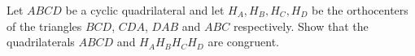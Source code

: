 Let $ABCD$ be a cyclic quadrilateral and let $H_{A}, H_{B}, H_{C}, H_{D}$ be the orthocenters of the triangles $BCD$,  $CDA$,  $DAB$ and $ABC$ respectively. Show that the quadrilaterals $ABCD$ and $H_{A}H_{B}H_{C}H_{D}$ are congruent.